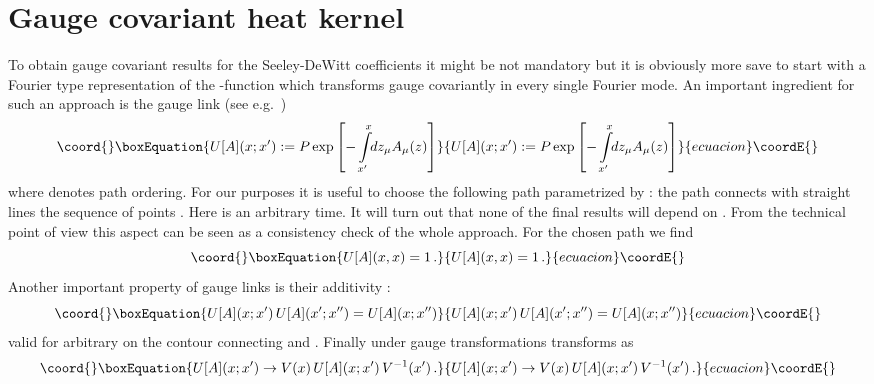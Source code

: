 \documentclass[a4paper,showpacs,showkeys,prd,nofootinbib]{revtex4}
\begin{document}
\section{Gauge covariant heat kernel}
\label{sec:covheat}

To obtain gauge covariant results for the Seeley-DeWitt coefficients it might be
not mandatory but it is obviously
more save to start with a Fourier type representation of the \myHighlight{$\delta$}\coordHE{}-function
which transforms gauge covariantly in every single Fourier mode. An important ingredient
for such an approach is the gauge link 
(see e.g.~\cite{Yang:1974kj,Bralic:1980ra,Elze:1986qd})
\begin{equation}\coord{}\boxEquation{
  \label{eq:defU}
U[A](x;x') := P \exp\left[ - \int\limits_{x'}^x \!\! dz_\mu A_\mu(z) \right]
}{
  U[A](x;x') := P \exp\left[ - \int\limits_{x'}^x \!\! dz_\mu A_\mu(z) \right]
}{ecuacion}\coordE{}\end{equation}
where \coordHE{} denotes path ordering. For our purposes it is useful to choose the following
path parametrized by \coordHE{}: the path connects with straight lines the sequence of points 
\coordHE{}.
Here \coordHE{} is an arbitrary time. It will turn out that none of the final results 
will depend on \coordHE{}. From the technical point of view this aspect can be seen as 
a consistency check of the whole approach. 
For the chosen path we find
\begin{equation}\coord{}\boxEquation{
  \label{eq:U1}
U[A](x,x) = 1  \,.
}{
  U[A](x,x) = 1  \,.
}{ecuacion}\coordE{}\end{equation}
Another important property of gauge links is their additivity 
\cite{Yang:1974kj,Bralic:1980ra,Elze:1986qd}:
\begin{equation}\coord{}\boxEquation{
  \label{eq:Uadd}
U[A](x;x') \, U[A](x';x'') = U[A](x;x'')
}{
  U[A](x;x') \, U[A](x';x'') = U[A](x;x'')
}{ecuacion}\coordE{}\end{equation}
valid for arbitrary \coordHE{} on the contour connecting \coordHE{} and \coordHE{}. 
Finally under gauge transformations \coordHE{} transforms as 
\cite{Yang:1974kj,Bralic:1980ra,Elze:1986qd}
\begin{equation}\coord{}\boxEquation{
  \label{eq:Utrafo}
U[A](x;x') \to V(x)\, U[A](x;x')  \, V^{-1}(x')  \,.
}{
  U[A](x;x') \to V(x)\, U[A](x;x')  \, V^{-1}(x')  \,.
}{ecuacion}\coordE{}\end{equation}
\end{document}

